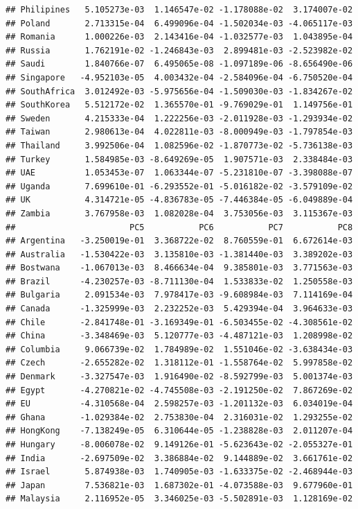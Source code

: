\documentclass[11pt,preprint, authoryear]{elsarticle}
\numberwithin{equation}{section}
\numberwithin{figure}{section}
\numberwithin{table}{section}
\begin{document}
\begin{verbatim}
## Philipines   5.105273e-03  1.146547e-02 -1.178088e-02  3.174007e-02
## Poland       2.713315e-04  6.499096e-04 -1.502034e-03 -4.065117e-03
## Romania      1.000226e-03  2.143416e-04 -1.032577e-03  1.043895e-04
## Russia       1.762191e-02 -1.246843e-03  2.899481e-03 -2.523982e-02
## Saudi        1.840766e-07  6.495065e-08 -1.097189e-06 -8.656490e-06
## Singapore   -4.952103e-05  4.003432e-04 -2.584096e-04 -6.750520e-04
## SouthAfrica  3.012492e-03 -5.975656e-04 -1.509030e-03 -1.834267e-02
## SouthKorea   5.512172e-02  1.365570e-01 -9.769029e-01  1.149756e-01
## Sweden       4.215333e-04  1.222256e-03 -2.011928e-03 -1.293934e-02
## Taiwan       2.980613e-04  4.022811e-03 -8.000949e-03 -1.797854e-03
## Thailand     3.992506e-04  1.082596e-02 -1.870773e-02 -5.736138e-03
## Turkey       1.584985e-03 -8.649269e-05  1.907571e-03  2.338484e-03
## UAE          1.053453e-07  1.063344e-07 -5.231810e-07 -3.398088e-07
## Uganda       7.699610e-01 -6.293552e-01 -5.016182e-02 -3.579109e-02
## UK           4.314721e-05 -4.836783e-05 -7.446384e-05 -6.049889e-04
## Zambia       3.767958e-03  1.082028e-04  3.753056e-03  3.115367e-03
##                       PC5           PC6           PC7           PC8
## Argentina   -3.250019e-01  3.368722e-02  8.760559e-01  6.672614e-03
## Australia   -1.530422e-03  3.135810e-03 -1.381440e-03  3.389202e-03
## Bostwana    -1.067013e-03  8.466634e-04  9.385801e-03  3.771563e-03
## Brazil      -4.230257e-03 -8.711130e-04  1.533833e-02  1.250558e-03
## Bulgaria     2.091534e-03  7.978417e-03 -9.608984e-03  7.114169e-04
## Canada      -1.325999e-03  2.232252e-03  5.429394e-04  3.964633e-03
## Chile       -2.841748e-01 -3.169349e-01 -6.503455e-02 -4.308561e-02
## China       -3.348469e-03  5.120777e-03 -4.487121e-03  1.208998e-02
## Columbia     9.066739e-02  1.784989e-02  1.551046e-02 -3.638434e-03
## Czech       -2.655282e-02  1.318112e-01 -1.558764e-02  5.997858e-02
## Denmark     -3.327547e-03  1.916490e-02 -8.592799e-03  5.001374e-03
## Egypt       -4.270821e-02 -4.745508e-03 -2.191250e-02  7.867269e-02
## EU          -4.310568e-04  2.598257e-03 -1.201132e-03  6.034019e-04
## Ghana       -1.029384e-02  2.753830e-04  2.316031e-02  1.293255e-02
## HongKong    -7.138249e-05  6.310644e-05 -1.238828e-03  2.011207e-04
## Hungary     -8.006078e-02  9.149126e-01 -5.623643e-02 -2.055327e-01
## India       -2.697509e-02  3.386884e-02  9.144889e-02  3.661761e-02
## Israel       5.874938e-03  1.740905e-03 -1.633375e-02 -2.468944e-03
## Japan        7.536821e-03  1.687302e-01 -4.073588e-03  9.677960e-01
## Malaysia     2.116952e-05  3.346025e-03 -5.502891e-03  1.128169e-02

\end{verbatim}
\end{document}
